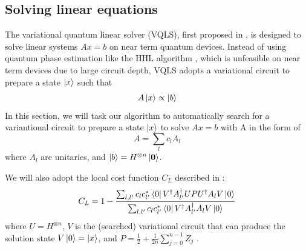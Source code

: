 \documentclass[a4paper,onecolumn,11pt]{quantumarticle}
\begin{document}
\subsection{Solving linear equations}
The variational quantum linear solver (VQLS), first proposed in \cite{Bravo-Prieto_undated-oq}, is designed to solve linear systems $Ax=b$ on near term quantum devices. Instead of using quantum phase estimation like the HHL algorithm \cite{HHL}, which is unfeasible on near term devices due to large circuit depth, VQLS adopts a variational circuit to prepare a state $\ket{x}$ such that 
\begin{equation}
    A\ket{x} \propto \ket{b}
\end{equation}
In this section, we will task our algorithm to automatically search for a variantional circuit to prepare a state $\ket{x}$ to solve $Ax = b$ with A in the form of 
\begin{equation}
    A = \sum_l c_l A_l
\end{equation}
where $A_l$ are unitaries, and $\ket{b} = H^{\otimes n}\ket{\mathbf{0}}$.

We will also adopt the local cost function $C_L$ described in \cite{Bravo-Prieto_undated-oq}:
\begin{equation}\label{eqn:vqls_local_loss}
C_{L}=1-\frac{\sum_{l, l^{\prime}} c_{l} c_{l^{\prime}}^{*}\bra{0}V^{\dagger} A_{l^{\prime}}^{\dagger} U P U^{\dagger} A_{l} V\ket{0}}{\sum_{l, l^{\prime}} c_{l} c_{l^{\prime}}^{*}\bra{0}V^{\dagger} A_{l^{\prime}}^{\dagger} A_{l} V\ket{0}}
\end{equation}
where $U=H^{\otimes n}$, $V$ is the (searched) variational circuit that can produce the solution state $V\ket{0} = \ket{x}$, and $P=\frac{1}{2}+\frac{1}{2 n} \sum_{j=0}^{n-1} Z_{j}$ \cite{pennylane_vqls}.
\end{document}
